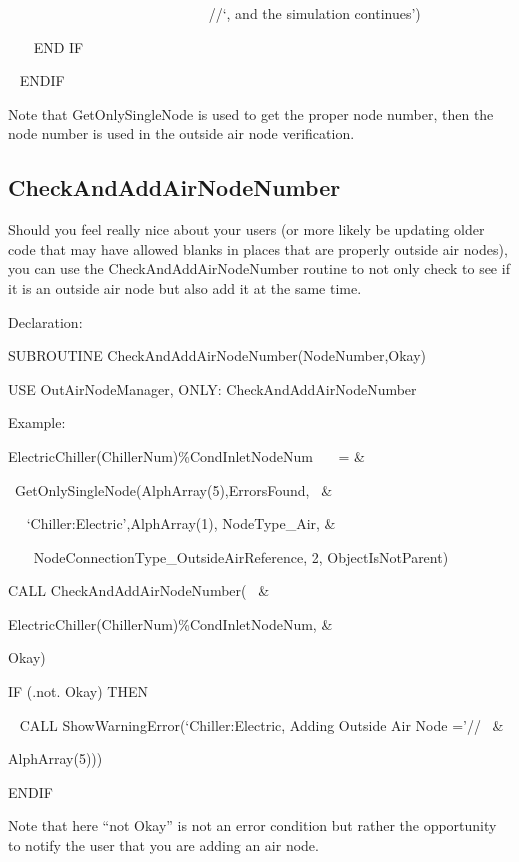 ~~~~~~~~~~~~~~~~~~~~~~~~~~~~ //`, and the simulation continues')

~~~ END IF

~ ENDIF

Note that GetOnlySingleNode is used to get the proper node number, then the node number is used in the outside air node verification.

\subsection{CheckAndAddAirNodeNumber}\label{checkandaddairnodenumber}

Should you feel really nice about your users (or more likely be updating older code that may have allowed blanks in places that are properly outside air nodes), you can use the CheckAndAddAirNodeNumber routine to not only check to see if it is an outside air node but also add it at the same time.

Declaration:

SUBROUTINE CheckAndAddAirNodeNumber(NodeNumber,Okay)

USE OutAirNodeManager, ONLY: CheckAndAddAirNodeNumber

Example:

ElectricChiller(ChillerNum)\%CondInletNodeNum~~~ = \&

~GetOnlySingleNode(AlphArray(5),ErrorsFound,~ \&

~~ `Chiller:Electric',AlphArray(1), NodeType\_Air, \&

~~~ NodeConnectionType\_OutsideAirReference, 2, ObjectIsNotParent)

CALL CheckAndAddAirNodeNumber(~ \&

ElectricChiller(ChillerNum)\%CondInletNodeNum, \&

Okay)

IF (.not. Okay) THEN

~ CALL ShowWarningError(`Chiller:Electric, Adding Outside Air Node ='//~ \&

AlphArray(5)))

ENDIF

Note that here ``not Okay'' is not an error condition but rather the opportunity to notify the user that you are adding an air node.
